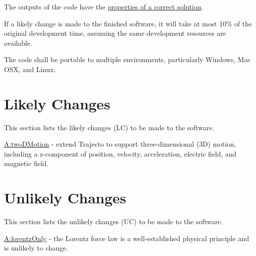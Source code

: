 \documentclass[12pt]{article}
\begin{document}
\begin{description}[font=\normalfont]
\item[Correctness:\phantomsection\label{correct}]{The outputs of the code have the \hyperref[Sec:CorSolProps]{properties of a correct solution}.}
\item[Maintainability:\phantomsection\label{maintainable}]{If a likely change is made to the finished software, it will take at most 10$\%$ of the original development time, assuming the same development resources are available.}
\item[Portability:\phantomsection\label{portable}]{The code shall be portable to multiple environments, particularly Windows, Mac OSX, and Linux.}
\end{description}
\section{Likely Changes}
\label{Sec:LCs}
This section lists the likely changes (LC) to be made to the software.

\begin{description}[font=\normalfont]
\item[lcExtendTo3D:\phantomsection\label{lcExtendTo3D}]{\hyperref[twoDMotion]{A:twoDMotion} - extend Trajecto to support three-dimensional (3D) motion, including a z-component of position, velocity, acceleration, electric field, and magnetic field.}
\end{description}
\section{Unlikely Changes}
\label{Sec:UCs}
This section lists the unlikely changes (UC) to be made to the software.

\begin{description}[font=\normalfont]
\item[ucLorentzForce:\phantomsection\label{ucLorentzForce}]{\hyperref[lorentzOnly]{A:lorentzOnly} - the Lorentz force law is a well-established physical principle and is unlikely to change.}
\end{description}
\end{document}
